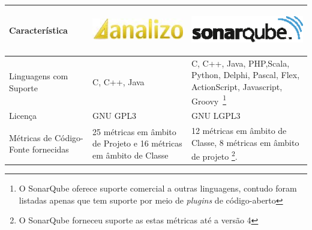 \begin{savenotes}
\begin{table}[!ht]
\centering
\begin{tabular}{|p{5cm}|p{4.5cm}|p{5cm}|}
\hline

Característica 

&

\begin{center}
\includegraphics[keepaspectratio=true,scale=0.48]{figuras/analizo.eps} 
\end{center}


&



\begin{center}
\includegraphics[keepaspectratio=true,scale=0.48]{figuras/sonarqube.eps} 
\end{center}





   
\\ \hline


Linguagens com Suporte  & C, C++, Java & C, C++, Java, PHP,Scala, Python, Delphi, Pascal, Flex, ActionScript, Javascript, Groovy~\footnote{O SonarQube oferece suporte comercial a outras linguagens, contudo foram listadas apenas que tem suporte por meio de \textit{plugins} de código-aberto} \\ \hline
Licença  & GNU GPL3 & GNU LGPL3  \\ \hline




Métricas de Código-Fonte fornecidas  & 25 métricas em âmbito de Projeto e 16  métricas em âmbito de Classe \cite{Meirelles2013} & 12 métricas em âmbito de Classe, 8 métricas em âmbito de projeto \footnote{O SonarQube forneceu suporte as estas métricas até a versão 4}. \\ \hline



\end{tabular}
\end{table}
\end{savenotes}
